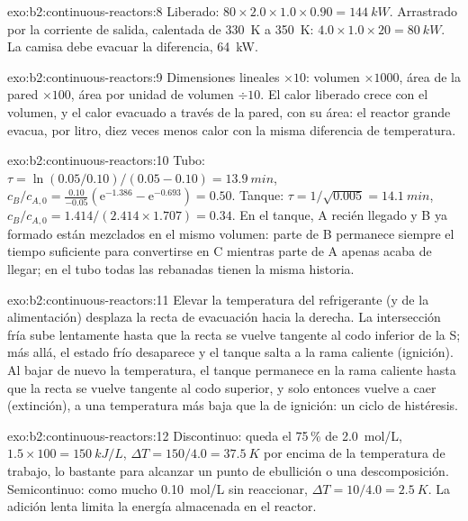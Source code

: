 \begin{solution}{exo:b2:continuous-reactors:8}
Liberado: $80 \times 2.0 \times 1.0 \times 0.90 = \qty{144}{kW}$. Arrastrado por la
corriente de salida, calentada de \qty{330}{K} a \qty{350}{K}: $4.0 \times 1.0 \times 20 =
\qty{80}{kW}$. La camisa debe evacuar la diferencia, \qty{64}{kW}.
\end{solution}

\begin{solution}{exo:b2:continuous-reactors:9}
Dimensiones lineales $\times 10$: volumen $\times 1000$, área de la pared $\times 100$, área
por unidad de volumen $\div 10$. El calor liberado crece con el volumen, y el calor
evacuado a través de la pared, con su área: el reactor grande evacua, por litro,
diez veces menos calor con la misma diferencia de temperatura.
\end{solution}

\begin{solution}{exo:b2:continuous-reactors:10}
Tubo: $\tau = \ln(0.05/0.10)/(0.05 - 0.10) = \qty{13.9}{min}$, $c_B/c_{A,0} =
\frac{0.10}{-0.05}(\mathrm e^{-1.386} - \mathrm e^{-0.693}) = 0.50$. Tanque: $\tau =
1/\sqrt{0.005} = \qty{14.1}{min}$, $c_B/c_{A,0} = 1.414/(2.414 \times 1.707) =
0.34$. En el tanque, A recién llegado y B ya formado están mezclados en el mismo volumen: parte de
B permanece siempre el tiempo suficiente para convertirse en C mientras parte de A apenas acaba de
llegar; en el tubo todas las rebanadas tienen la misma historia.
\end{solution}

\begin{solution}{exo:b2:continuous-reactors:11}
Elevar la temperatura del refrigerante (y de la alimentación) desplaza la recta de evacuación hacia la
derecha. La intersección fría sube lentamente hasta que la recta se vuelve tangente al
codo inferior de la S; más allá, el estado frío desaparece y el tanque salta
a la rama caliente (ignición). Al bajar de nuevo la temperatura, el tanque permanece
en la rama caliente hasta que la recta se vuelve tangente al codo superior, y solo
entonces vuelve a caer (extinción), a una temperatura más baja que la de ignición: un
ciclo de histéresis.
\end{solution}

\begin{solution}{exo:b2:continuous-reactors:12}
Discontinuo: queda el 75\,\% de \qty{2.0}{mol/L}, $1.5 \times 100 = \qty{150}{kJ/L}$,
$\Delta T = 150/4.0 = \qty{37.5}{K}$ por encima de la temperatura de trabajo, lo bastante para
alcanzar un punto de ebullición o una descomposición. Semicontinuo: como mucho
\qty{0.10}{mol/L} sin reaccionar, $\Delta T = 10/4.0 = \qty{2.5}{K}$. La adición lenta
limita la energía almacenada en el reactor.
\end{solution}

